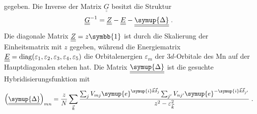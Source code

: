 gegeben.
Die Inverse der Matrix  $\underline{\underline{G}}$ besitzt die Struktur 
\begin{equation}
    \underline{\underline{G}}^{-1} = \underline{\underline{Z}} - \underline{\underline{E}} - \underline{\underline{\symup{\Delta}}} \; .
\end{equation}
Die diagonale Matrix $\underline{\underline{Z}} = z\symbb{1}$ ist durch die Skalierung der Einheitsmatrix mit $z$ gegeben, während die Energiematrix 
$\underline{\underline{E}} = \operatorname{diag}(\varepsilon_1, \varepsilon_2, \varepsilon_3, \varepsilon_4, \varepsilon_5)$
die Orbitalenergien $\varepsilon_m$ der $3d$-Orbitale des Mn auf der Hauptdiagonalen stehen hat.
Die Matrix $\underline{\underline{\symup{\Delta}}}$ ist die gesuchte Hybridisierungsfunktion mit 
\begin{equation*}
    \left ( \underline{\underline{\symup{\Delta}}} \right )_{mn} =  \frac{z}{N}\sum_{\vec{k}}
    \frac{\sum_j V_{mj}\symup{e}^{\symup{i}\vec{k}\vec{\delta}_j}\sum_{j'} V_{nj'}\symup{e}^{-\symup{i}\vec{k}\vec{\delta}_{j'}}}
    {z^2-\varepsilon_{\vec{k}}^2} \; .
\end{equation*}
